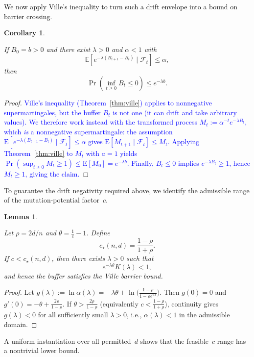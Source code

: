 \documentclass[lettersize,journal]{IEEEtran}
\newcommand{\new}[1]{\textcolor{black}{#1}}
\newcommand{\EE}{\text{E}}
\newtheorem{corollary}{Corollary}
\newtheorem{lemma}{Lemma}
\begin{document}
{\new{We now apply Ville's inequality to turn such a drift envelope into a bound on barrier crossing.}


\begin{corollary}
\label{cor:ville-exponential}
	
	If $B_0=b>0$ and there exist $\lambda>0$ and $\alpha<1$ with
	\[
	\mathbb{E}[e^{-\lambda(B_{t+1}-B_t)}\mid\mathcal{F}_t]\le\alpha,
	\]
	then
	\[
	\Pr\!\left(\inf_{t\ge0} B_t \le 0\right) \le e^{-\lambda b}.
	\]
\end{corollary}

\begin{proof}
	\textcolor{blue}{Ville's inequality (Theorem~\ref{thm:ville}) applies to nonneg\-ative
	supermartingales, but the buffer $B_t$ is not one (it can drift and take
	arbitrary values).  We therefore work instead with the transformed process
	$M_t := \alpha^{-t}e^{-\lambda B_t}$, which \emph{is} a nonneg\-ative
	supermartingale: the assumption $\EE[e^{-\lambda(B_{t+1}-B_t)}\mid\mathcal F_t]
	\le \alpha$ gives $\EE[M_{t+1}\mid\mathcal F_t]\le M_t$.
	Applying Theorem~\ref{thm:ville} to $M_t$ with $a=1$ yields
	$\Pr(\sup_{t\ge 0} M_t\ge 1)\le \EE[M_0]=e^{-\lambda b}$.
	Finally, $B_t\le 0$ implies $e^{-\lambda B_t}\ge 1$, hence $M_t\ge 1$,
	giving the claim.}
	
\end{proof}


To guarantee the drift negativity required above, we identify the admissible 
range of the mutation-potential factor~$c$.

\begin{lemma}\label{lem:c-threshold-instance}
	
	Let $\rho=2d/n$ and $\theta=\frac{1}{c}-1$.  
	Define
	\[
	c_\star(n,d)=\frac{1-\rho}{1+\rho}.
	\]
	If $c<c_\star(n,d)$, then there exists $\lambda>0$ such that
	\[
	e^{-\lambda\theta}K(\lambda) < 1,
	\]
	and hence the buffer satisfies the Ville barrier bound.
\end{lemma}

\begin{proof}
	Let $g(\lambda):=\ln\alpha(\lambda)=-\lambda\theta+\ln\!\big(\tfrac{1-\rho}{1-\rho e^{2\lambda}}\big)$. 
	Then $g(0)=0$ and $g'(0)=-\theta+\tfrac{2\rho}{1-\rho}$. 
	If $\theta>\tfrac{2\rho}{1-\rho}$ (equivalently $c<\tfrac{1-\rho}{1+\rho}$), continuity gives $g(\lambda)<0$ for all sufficiently small $\lambda>0$, i.e., $\alpha(\lambda)<1$ in the admissible domain.
\end{proof}

A uniform instantiation over all permitted~$d$ shows that the feasible~$c$ 
range has a nontrivial lower bound.

}
\end{document}
